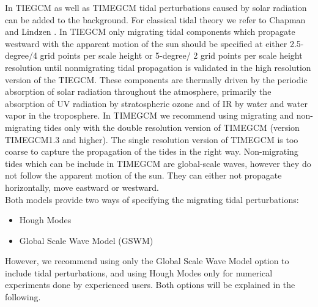 In TIEGCM as well as TIMEGCM tidal perturbations caused by 
solar radiation can be added to the background. For classical tidal theory we refer to Chapman
and Lindzen \cite{Chapman1970}. In TIEGCM only migrating tidal components
which propagate westward with the apparent motion of the sun should be specified at either 2.5-degree/4 grid points
per scale height or 5-degree/ 2 grid points per scale height resolution until nonmigrating tidal propagation is
validated in the high resolution version of the TIEGCM. These components are thermally 
driven by the periodic absorption of solar radiation throughout the atmosphere, primarily the 
absorption of UV radiation by stratospheric ozone and of IR by water and water vapor in the 
troposphere. In TIMEGCM we recommend using migrating and non-migrating tides only with the 
double resolution version of TIMEGCM (version TIMEGCM1.3 and higher). The single resolution 
version of TIMEGCM is too coarse to capture the propagation of the tides in the
right way. Non-migrating tides which can be include in TIMEGCM are global-scale waves, 
however they do not follow the
apparent motion of the sun. They can either not propagate horizontally, move eastward or
westward.\\

Both models provide two ways of specifying the migrating tidal perturbations:
%
\begin{itemize}  
  \item Hough Modes
  \item Global Scale Wave Model (GSWM)
\end{itemize}  
%
However, we recommend using only the Global Scale Wave Model option to include tidal perturbations, and
using Hough Modes only for numerical experiments done by experienced users. Both options will be
explained in the following.
%
